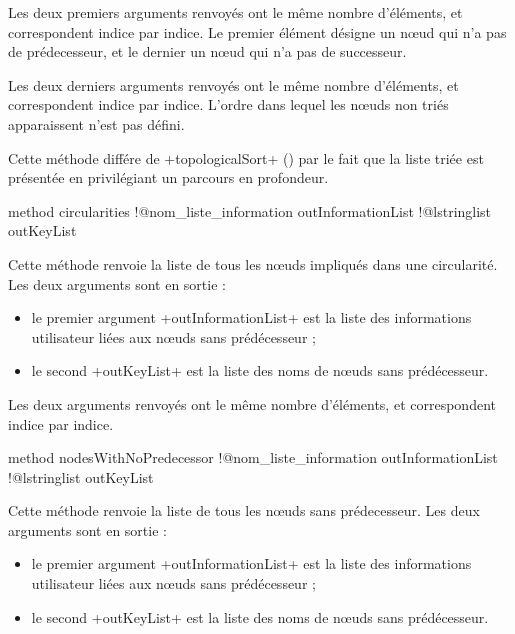 Les deux premiers arguments renvoyés ont le même nombre d'éléments, et correspondent indice par indice. Le premier élément désigne un nœud qui n'a pas de prédecesseur, et le dernier un nœud qui n'a pas de successeur.


Les deux derniers arguments renvoyés ont le même nombre d'éléments, et correspondent indice par indice. L'ordre dans lequel les nœuds non triés apparaissent n'est pas défini.

Cette méthode différe de \ggs+topologicalSort+ () par le fait que la liste triée est présentée en privilégiant un parcours en profondeur.







\begin{galgas}
method circularities
  !@nom_liste_information outInformationList
  !@lstringlist outKeyList
\end{galgas}

Cette méthode renvoie la liste de tous les nœuds impliqués dans une circularité. Les deux arguments sont en sortie :
\begin{itemize}
  \item le premier argument \ggs+outInformationList+ est la liste des informations utilisateur liées aux nœuds sans prédécesseur ;
  \item le second \ggs+outKeyList+ est la liste des noms de nœuds sans prédécesseur.
\end{itemize}

Les deux arguments renvoyés ont le même nombre d'éléments, et correspondent indice par indice.







\begin{galgas}
method nodesWithNoPredecessor
  !@nom_liste_information outInformationList
  !@lstringlist outKeyList
\end{galgas}

Cette méthode renvoie la liste de tous les nœuds sans prédecesseur. Les deux arguments sont en sortie :
\begin{itemize}
  \item le premier argument \ggs+outInformationList+ est la liste des informations utilisateur liées aux nœuds sans prédécesseur ;
  \item le second \ggs+outKeyList+ est la liste des noms de nœuds sans prédécesseur.
\end{itemize}

